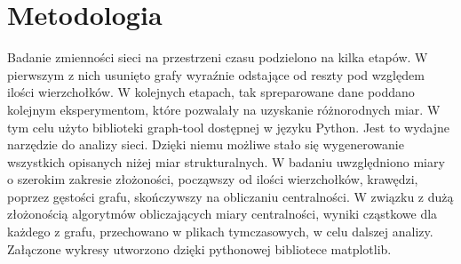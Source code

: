 \section{Metodologia}
Badanie zmienności sieci na przestrzeni czasu podzielono na kilka etapów. W pierwszym z nich usunięto grafy wyraźnie odstające od reszty pod względem ilości wierzchołków. W kolejnych etapach, tak spreparowane dane poddano kolejnym eksperymentom, które pozwalały na uzyskanie różnorodnych miar. W tym celu użyto biblioteki graph-tool dostępnej w języku Python. Jest to wydajne narzędzie do analizy sieci. Dzięki niemu możliwe stało się wygenerowanie wszystkich opisanych niżej miar strukturalnych. W badaniu uwzględniono miary o szerokim zakresie złożoności, począwszy od ilości wierzchołków, krawędzi, poprzez gęstości grafu, skończywszy na obliczaniu centralności. W związku z dużą złożonością algorytmów obliczających miary centralności, wyniki cząstkowe dla każdego z grafu, przechowano w plikach tymczasowych, w celu dalszej analizy. Załączone wykresy utworzono dzięki pythonowej bibliotece matplotlib.
